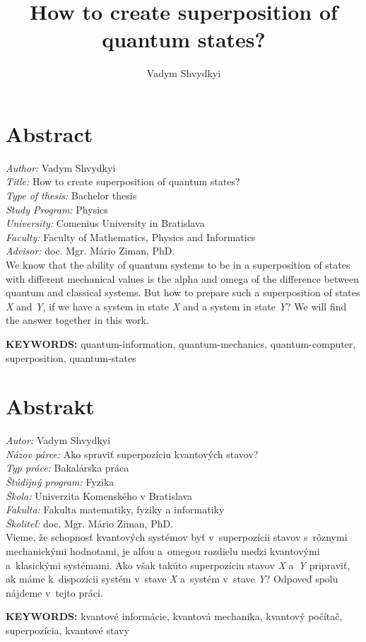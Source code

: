 \documentclass[english,14pt,a4paper]{article}
\title{How to create superposition of quantum states?}
\author{Vadym Shvydkyi}
\begin{document}
	\maketitle
	\pagebreak
	\section*{Abstract}
	\begin{spacing}{1.5}
	\textit{Author:} Vadym Shvydkyi \\
	\textit{Title:} How to create superposition of quantum states? \\
	\textit{Type of thesis:} Bachelor thesis \\
	\textit{Study Program:} Physics \\
	\textit{University:} Comenius University in Bratislava \\
	\textit{Faculty:} Faculty of Mathematics, Physics and Informatics \\
	\textit{Advisor:} doc. Mgr. Mário Ziman, PhD. \\
	
	We know that the ability of quantum systems to be in a superposition of states with different mechanical values is the alpha and omega of the difference between quantum and classical systems. But how to prepare such a superposition of states \textit{X} and \textit{Y}, if we have a system in state \textit{X} and a system in state \textit{Y}? We will find the answer together in this work.
	
	\textbf{KEYWORDS:} quantum-information, quantum-mechanics, quantum-computer, superposition, quantum-states
	\pagebreak
	\end{spacing}
	\pagebreak

	\section*{Abstrakt}
	\begin{spacing}{1.5}
		\textit{Autor:} Vadym Shvydkyi \\
		\textit{Názov párce:} Ako spraviť superpozíciu kvantových stavov? \\
		\textit{Typ práce:} Bakalárska práca \\
		\textit{Štúdijný program:} Fyzika \\
		\textit{Škola:} Univerzita Komenského v Bratislava \\
		\textit{Fakulta:} Fakulta matematiky, fyziky a informatiky \\
		\textit{Školiteľ:} doc. Mgr. Mário Ziman, PhD. \\
		
		Vieme, že schopnosť kvantových systémov byť v superpozícii stavov s rôznymi mechanickými hodnotami, je alfou a omegou rozdielu medzi kvantovými a klasickými systémami. Ako však takúto superpozíciu stavov \textit{X} a \textit{Y} pripraviť, ak máme k dispozícii systém v stave \textit{X} a systém v stave \textit{Y}? Odpoveď spolu nájdeme v tejto práci.
		
		\textbf{KEYWORDS:} kvantové informácie, kvantová mechanika, kvantový počítač, superpozícia, kvantové stavy
		\pagebreak
	\end{spacing}
	
\end{document}
